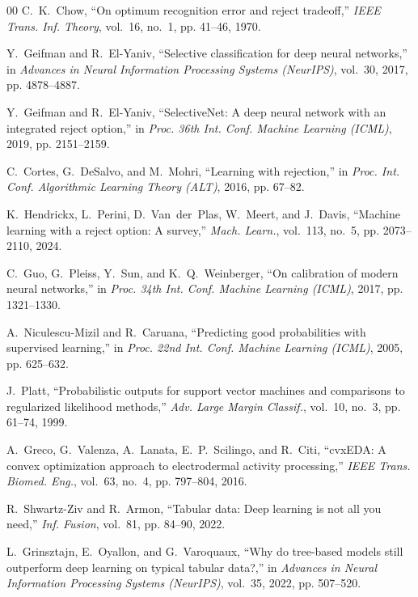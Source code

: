 \documentclass[conference]{IEEEtran}
\begin{document}
\begin{thebibliography}{00}
C.~K.~Chow, ``On optimum recognition error and reject tradeoff,'' \textit{IEEE Trans. Inf. Theory}, vol.~16, no.~1, pp. 41--46, 1970.

Y.~Geifman and R.~El-Yaniv, ``Selective classification for deep neural networks,'' in \textit{Advances in Neural Information Processing Systems (NeurIPS)}, vol.~30, 2017, pp. 4878--4887.

Y.~Geifman and R.~El-Yaniv, ``SelectiveNet: A deep neural network with an integrated reject option,'' in \textit{Proc. 36th Int. Conf. Machine Learning (ICML)}, 2019, pp. 2151--2159.

C.~Cortes, G.~DeSalvo, and M.~Mohri, ``Learning with rejection,'' in \textit{Proc. Int. Conf. Algorithmic Learning Theory (ALT)}, 2016, pp. 67--82.

K.~Hendrickx, L.~Perini, D.~Van~der~Plas, W.~Meert, and J.~Davis, ``Machine learning with a reject option: A survey,'' \textit{Mach. Learn.}, vol.~113, no.~5, pp. 2073--2110, 2024.

C.~Guo, G.~Pleiss, Y.~Sun, and K.~Q.~Weinberger, ``On calibration of modern neural networks,'' in \textit{Proc. 34th Int. Conf. Machine Learning (ICML)}, 2017, pp. 1321--1330.

A.~Niculescu-Mizil and R.~Caruana, ``Predicting good probabilities with supervised learning,'' in \textit{Proc. 22nd Int. Conf. Machine Learning (ICML)}, 2005, pp. 625--632.

J.~Platt, ``Probabilistic outputs for support vector machines and comparisons to regularized likelihood methods,'' \textit{Adv. Large Margin Classif.}, vol.~10, no.~3, pp. 61--74, 1999.

A.~Greco, G.~Valenza, A.~Lanata, E.~P.~Scilingo, and R.~Citi, ``cvxEDA: A convex optimization approach to electrodermal activity processing,'' \textit{IEEE Trans. Biomed. Eng.}, vol.~63, no.~4, pp. 797--804, 2016.

R.~Shwartz-Ziv and R.~Armon, ``Tabular data: Deep learning is not all you need,'' \textit{Inf. Fusion}, vol.~81, pp. 84--90, 2022.

L.~Grinsztajn, E.~Oyallon, and G.~Varoquaux, ``Why do tree-based models still outperform deep learning on typical tabular data?,'' in \textit{Advances in Neural Information Processing Systems (NeurIPS)}, vol.~35, 2022, pp. 507--520.


\end{thebibliography}
\end{document}
